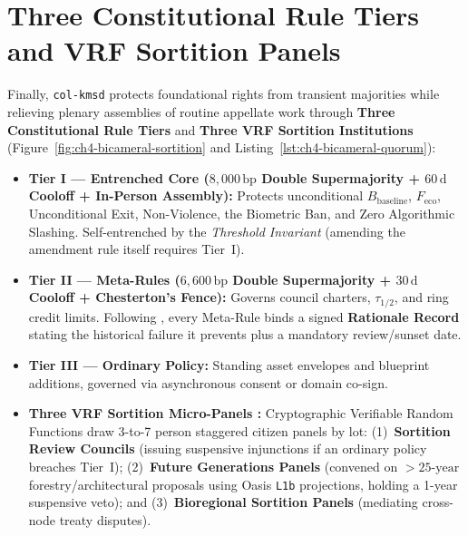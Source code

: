 \section{Three Constitutional Rule Tiers and VRF Sortition Panels}
\label{sec:ch4-tiers-sortition}

Finally, \texttt{col-kmsd} protects foundational rights from transient majorities while relieving
plenary assemblies of routine appellate work through \textbf{Three Constitutional Rule Tiers} and
\textbf{Three VRF Sortition Institutions} (Figure~\ref{fig:ch4-bicameral-sortition} and
Listing~\ref{lst:ch4-bicameral-quorum}):

\begin{itemize}
\item \textbf{Tier I --- Entrenched Core ($8{,}000\,\mathrm{bp}$ Double Supermajority + $60\,\mathrm{d}$ Cooloff + In-Person Assembly):}
        Protects unconditional $B_{\mathrm{baseline}}$, $F_{\mathrm{eco}}$, Unconditional Exit,
        Non-Violence, the Biometric Ban, and Zero Algorithmic Slashing. Self-entrenched by the
        \textit{Threshold Invariant} (amending the amendment rule itself requires Tier~I).
\item \textbf{Tier II --- Meta-Rules ($6{,}600\,\mathrm{bp}$ Double Supermajority + $30\,\mathrm{d}$ Cooloff + Chesterton's Fence):}
        Governs council charters, $\tau_{1/2}$, and ring credit limits. Following
        \textcite{chesterton1929}, every Meta-Rule binds a signed \textbf{Rationale Record} stating
        the historical failure it prevents plus a mandatory review/sunset date.
\item \textbf{Tier III --- Ordinary Policy:} Standing asset envelopes and blueprint additions,
        governed via asynchronous consent \parencite{buck2007sociocracy} or domain co-sign.
\item \textbf{Three VRF Sortition Micro-Panels \parencite{fishkin1991,sintomer2010sortition,wales2015future}:}
        Cryptographic Verifiable Random Functions \parencite{micali1999vrf} draw 3-to-7 person
        staggered citizen panels by lot: (1)~\textbf{Sortition Review Councils} (issuing
        suspensive injunctions if an ordinary policy breaches Tier~I); (2)~\textbf{Future
        Generations Panels} (convened on $>25\text{-year}$ forestry/architectural proposals using
        Oasis \texttt{L1b} projections, holding a 1-year suspensive veto); and
        (3)~\textbf{Bioregional Sortition Panels} (mediating cross-node treaty disputes).
\end{itemize}

